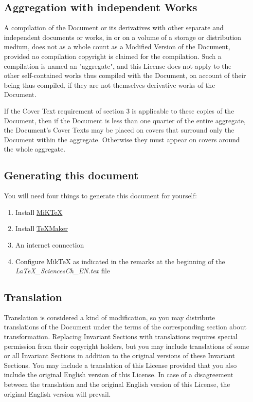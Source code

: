 	\subsection{Aggregation with independent Works} 
	A compilation of the Document or its derivatives with other separate and independent documents or works, in or on a volume of a storage or distribution medium, does not as a whole count as a Modified Version of the Document, provided no compilation copyright is claimed for the compilation. Such a compilation is named an "aggregate", and this License does not apply to the other self-contained works thus compiled with the Document, on account of their being thus compiled, if they are not themselves derivative works of the Document. 

	If the Cover Text requirement of section 3 is applicable to these copies of the Document, then if the Document is less than one quarter of the entire aggregate, the Document's Cover Texts may be placed on covers that surround only the Document within the aggregate. Otherwise they must appear on covers around the whole aggregate. 
	
	\subsection{Generating this document}
	You will need four things to generate this document for yourself:
	\begin{enumerate}
		\item Install \href{https://miktex.org/}{MiKTeX}

		\item Install \href{http://www.xm1math.net/texmaker/index_fr.html}{TeXMaker}

		\item An internet connection

		\item Configure MikTeX as indicated in the remarks at the beginning of the \textit{LaTeX\_SciencesCh\_EN.tex} file
	\end{enumerate}

	\subsection{Translation}
	Translation is considered a kind of modification, so you may distribute translations of the Document under the terms of the corresponding section about transformation. Replacing Invariant Sections with translations requires special permission from their copyright holders, but you may include translations of some or all Invariant Sections in addition to the original versions of these Invariant Sections. You may include a translation of this License provided that you also include the original English version of this License. In case of a disagreement between the translation and the original English version of this License, the original English version will prevail. 

